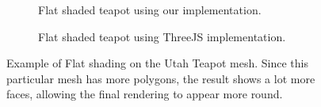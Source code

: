 \documentclass[10pt,twocolumn,letterpaper]{article}
\begin{document}
\begin{figure}
    \centering
    \begin{subfigure}{.48\linewidth}
        \caption{Flat shaded teapot using our implementation.}
        \label{fig:our-flat-tea}
    \end{subfigure}
    \hfill
    \begin{subfigure}{.48\linewidth}
        \caption{Flat shaded teapot using ThreeJS implementation.}
        \label{fig:three-flat-tea}
    \end{subfigure}
    \caption{Example of Flat shading on the Utah Teapot mesh. Since this particular mesh has more polygons, the result shows a lot more faces, allowing the final rendering to appear more round.}
    \label{fig:flat-tea}
\end{figure}
\end{document}
